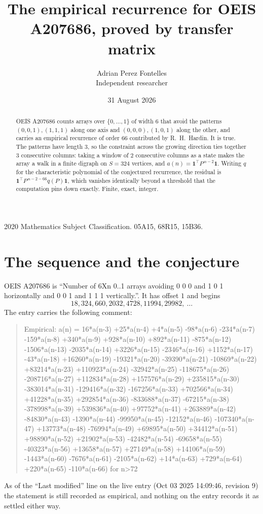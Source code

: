 \documentclass[11pt,a4paper]{article}
\title{The empirical recurrence for OEIS A207686, proved by transfer matrix}
\author{Adrian Perez Fontelles\\ \small Independent researcher}
\date{31 August 2026}
\theoremstyle{plain}
\theoremstyle{definition}
\begin{document}
\maketitle

\begin{abstract}
OEIS A207686 counts arrays over $\{0,\dots,1\}$ of width $6$ that avoid the patterns
$(0,0,1), (1,1,1)$ along one axis and $(0,0,0), (1,0,1)$ along the other, and carries an empirical recurrence of
order $66$ contributed by R.~H.~Hardin. It is true. The patterns have length $3$, so
the constraint across the growing direction ties together $3$ consecutive columns: taking a
window of $2$ consecutive columns as a state makes the array a walk in a finite digraph
on $S=324$ vertices, and $a(n)=\mathbf{1}^{\!\top}P^{\,n-2}\mathbf{1}$. Writing $q$
for the characteristic polynomial of the conjectured recurrence, the residual is
$\mathbf{1}^{\!\top}P^{\,n-2-66}q(P)\mathbf{1}$, which vanishes identically
beyond a threshold that the computation pins down exactly. Finite, exact, integer.
\end{abstract}

\noindent\small 2020 Mathematics Subject Classification. 05A15, 68R15, 15B36.\normalsize

\section{The sequence and the conjecture}

OEIS A207686 is ``Number of 6Xn 0..1 arrays avoiding 0 0 0 and 1 0 1 horizontally and 0 0 1 and 1 1 1 vertically.''. It has offset
$1$ and begins
\[
18, 324, 660, 2032, 4728, 11994, 29982,\ \dots
\]
The entry carries the following comment:
\begin{quote}\small
Empirical: a(n) = 16*a(n-3) +25*a(n-4) +4*a(n-5) -98*a(n-6) -234*a(n-7) -159*a(n-8) +340*a(n-9) +928*a(n-10) +892*a(n-11) -875*a(n-12) -1506*a(n-13) -2035*a(n-14) +3226*a(n-15) -2346*a(n-16) +1152*a(n-17) -43*a(n-18) +16260*a(n-19) -19321*a(n-20) -39390*a(n-21) -10869*a(n-22) +83214*a(n-23) +110923*a(n-24) -32942*a(n-25) -118675*a(n-26) -208716*a(n-27) +112834*a(n-28) +157576*a(n-29) +235815*a(n-30) -383014*a(n-31) -129416*a(n-32) -167256*a(n-33) +702566*a(n-34) +41228*a(n-35) +292854*a(n-36) -833688*a(n-37) -67215*a(n-38) -378998*a(n-39) +539836*a(n-40) +97752*a(n-41) +263889*a(n-42) -84830*a(n-43) -1390*a(n-44) -99950*a(n-45) -12152*a(n-46) -107340*a(n-47) +13773*a(n-48) -76994*a(n-49) +69895*a(n-50) +34412*a(n-51) +98890*a(n-52) +21902*a(n-53) -42482*a(n-54) -69658*a(n-55) -40323*a(n-56) +13658*a(n-57) +27149*a(n-58) +14106*a(n-59) -1443*a(n-60) -7676*a(n-61) -2105*a(n-62) +14*a(n-63) +729*a(n-64) +220*a(n-65) -110*a(n-66) for n>72
\end{quote}
As of the ``Last modified'' line on the live entry (Oct 03 2025 14:09:46, revision
9) the statement is still recorded as empirical, and nothing on the entry
records it as settled either way.
\end{document}
